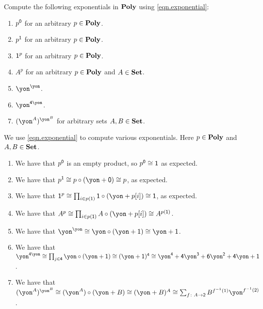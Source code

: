 \documentclass[Book-Poly]{subfiles}
\begin{document}
\begin{exercise}
Compute the following exponentials in $\mathbf{Poly}$ using \eqref{eqn.exponential}:
\begin{enumerate}
	\item $p^{\textsf{0}}$ for an arbitrary $p\in\mathbf{Poly}$.
	\item $p^{\textsf{1}}$ for an arbitrary $p\in\mathbf{Poly}$.
	\item $\textsf{1}^p$ for an arbitrary $p\in\mathbf{Poly}$.
	\item $A^p$ for an arbitrary $p\in\mathbf{Poly}$ and $A\in\mathbf{Set}$.
	\item $\yon^\yon$.
	\item $\yon^{\4\yon}$.
	\item $(\yon^A)^{\yon^B}$ for arbitrary sets $A,B\in\mathbf{Set}$.
\qedhere
\end{enumerate}
\begin{solution}
We use \eqref{eqn.exponential} to compute various exponentials.
Here $p \in \mathbf{Poly}$ and $A, B \in \mathbf{Set}$.
\begin{enumerate}
    \item We have that $p^{\textsf{0}}$ is an empty product, so $p^{\textsf{0}} \cong \textsf{1}$ as expected.
	\item We have that $p^\1 \iso p \circ (\yon + \0) \iso p$, as expected.
	\item We have that $\1^p \iso \prod_{i \in p(\1)} \1 \circ (\yon + p[i]) \iso \1$, as expected.
	\item We have that $A^p \iso \prod_{i \in p(\1)} A \circ (\yon + p[i]) \iso A^{p(\1)}$.
	\item We have that $\yon^\yon \iso \yon \circ (\yon + \1) \iso \yon + \1$.
	\item We have that $\yon^{\4\yon} \iso \prod_{j \in \4} \yon \circ (\yon + \1) \iso (\yon + \1)^\4 \iso \yon^\4 + \4\yon^\3 + \6\yon^\2 + \4\yon + \1$.
	\item We have that $(\yon^A)^{\yon^B} \iso (\yon^A) \circ (\yon + B) \iso (\yon + B)^A \iso \sum_{f \colon A \to \2} B^{f\inv(1)} \yon^{f\inv(2)}$.
\end{enumerate}
\end{solution}
\end{exercise}

\end{document}
